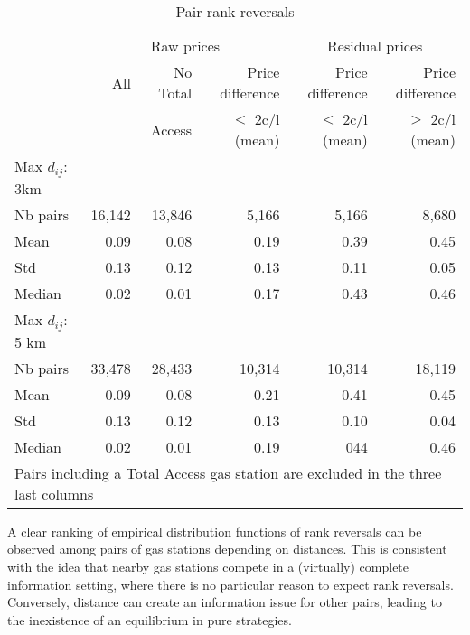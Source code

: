 \documentclass[english]{article}
\begin{document}
{\renewcommand{\arraystretch}{1.1}

\begin{table}
\caption{Pair rank reversals}
\centering
\begin{footnotesize}
\begin{tabular}{lrrrrr}
\hline
\hline
{} & \multicolumn{3}{c}{Raw prices} & \multicolumn{2}{c}{Residual prices}  \\
{} & All & No Total & Price difference & Price difference & Price difference \\
{} & {} & Access & $\le$ 2c/l (mean) & $\le$ 2c/l (mean) & $\ge$ 2c/l (mean)\\
\hline
Max $d_{ij}$: 3km & {} & {} & {} & {} & {} \\
\hline
Nb pairs & 16,142 & 13,846 & 5,166 & 5,166 & 8,680 \\
Mean & 0.09 & 0.08 & 0.19 & 0.39 & 0.45 \\
Std & 0.13 & 0.12 & 0.13 & 0.11 & 0.05 \\
Median & 0.02 & 0.01 & 0.17 & 0.43 & 0.46 \\
\hline
Max $d_{ij}$: 5 km & {} & {} & {} & {} & {} \\
\hline
Nb pairs & 33,478 & 28,433 & 10,314 & 10,314 & 18,119 \\
Mean & 0.09 & 0.08 & 0.21 & 0.41 & 0.45 \\
Std & 0.13 & 0.12 & 0.13 & 0.10 & 0.04 \\
Median & 0.02 & 0.01 & 0.19 & 044 & 0.46 \\
\hline
\hline
\multicolumn{6}{l}{\small Pairs including a Total Access gas station are excluded in the three last columns}\\
\end{tabular}
\end{footnotesize}
\end{table}

{\renewcommand{\arraystretch}{1.0}

A clear ranking of empirical distribution functions of rank reversals can be observed among pairs of gas stations depending on distances. This is consistent with the idea that nearby gas stations compete in a (virtually) complete information setting, where there is no particular reason to expect rank reversals. Conversely, distance can create an information issue for other pairs, leading to the inexistence of an equilibrium in pure strategies.

}}
\end{document}
